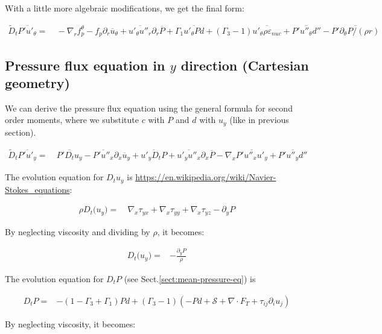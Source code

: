 \documentclass[10pt,paper=a4]{report}
\newcommand{\eht}{\overline}
\newcommand{\fht}{\widetilde}
\begin{document}
\noindent With a little more algebraic modifications, we get the final form:

\begin{align}
  \fht{D}_t \eht{P'u'_\theta} = & \ -\nabla_r f_p^\theta - f_p\partial_r \eht{u}_\theta + \eht{u'_\theta u''_r}\partial_r \eht{P} +\Gamma_1 \eht{u'_\theta P d} + (\Gamma_3 -1)\eht{u'_\theta \rho \varepsilon_{nuc}} + \eht{P'u''_\theta d''} - \eht{P'\partial_{\theta} P / (\rho r)}  
\end{align}

\subsection{Pressure flux equation in $y$ direction (Cartesian geometry)}

We can derive the pressure flux equation using the general formula for second order moments, where we substitute $c$ with $P$ and $d$ with $u_y$ (like in previous section).

\begin{align}
  \fht{D}_t \eht{P'u'_y} = & \ \eht{P'D_t u_y} - \eht{P'u''_x} \partial_x \eht{u}_y + \eht{u'_y D_t P} + \eht{u'_y u''_x} \partial_x \eht{P} - \nabla_x \eht{P' u''_x u'_y} + \eht{P'u''_y d''} 
\end{align}

\noindent
The evolution equation for $D_t u_y$ is \href{https://en.wikipedia.org/wiki/Navier-Stokes_equations}{https://en.wikipedia.org/wiki/Navier-Stokes\_equations}: 

\begin{align}
\rho D_{t} \big(u_{y}\big) = & \ \nabla_x \tau_{yx} + \nabla_x \tau_{yy} + \nabla_x \tau_{yz} - \partial_{y} P 
\end{align}

\noindent
By neglecting viscosity and dividing by $\rho$, it becomes:

\begin{align}
D_{t} \big(u_{y}\big) = & -\frac{\partial_{y} P}{\rho}
\end{align}

\noindent
The evolution equation for $D_t P$ (see Sect.\ref{sect:mean-pressure-eq}) is 

\begin{align}
D_t P = & -(1-\Gamma_3+\Gamma_1)Pd + (\Gamma_3 -1)(-Pd + {\mathcal S} + \nabla \cdot F_T + \tau_{ij}\partial_i u_j)
\end{align}

\noindent
By neglecting viscosity, it becomes:
\end{document}
